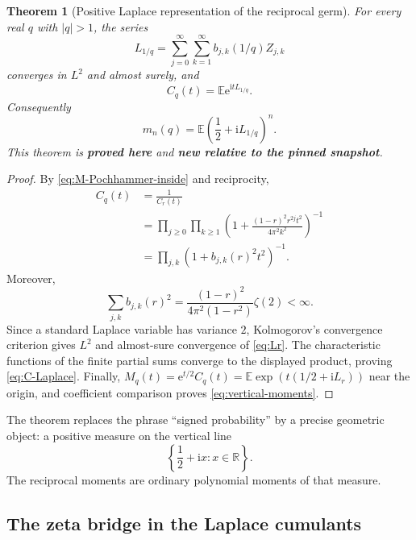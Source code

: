 \documentclass[11pt,oneside]{article}
\numberwithin{equation}{section}
\newtheorem{theorem}{Theorem}[section]
\theoremstyle{definition}
\theoremstyle{remark}
\newcommand{\R}{\mathbb R}
\newcommand{\E}{\mathbb E}
\newcommand{\e}{\mathrm e}
\newcommand{\ii}{\mathrm i}
\newcommand{\proved}{\textcolor{deepgreen}{\textbf{proved here}}}
\newcommand{\auditnew}{\textcolor{deepviolet}{\textbf{new relative to the pinned snapshot}}}
\begin{document}
\begin{theorem}[Positive Laplace representation of the reciprocal germ]
\label{thm:laplace-dual}
For every real $q$ with $|q|>1$, the series
\begin{equation}
 L_{1/q}=\sum_{j=0}^{\infty}\sum_{k=1}^{\infty}
 b_{j,k}(1/q)Z_{j,k}
 \label{eq:Lr}
\end{equation}
converges in $L^2$ and almost surely, and
\begin{equation}
 \boxed{C_q(t)=\E\e^{\ii tL_{1/q}}.}
 \label{eq:C-Laplace}
\end{equation}
Consequently
\begin{equation}
 \boxed{m_n(q)=\E\left(\frac12+\ii L_{1/q}\right)^n.}
 \label{eq:vertical-moments}
\end{equation}
This theorem is \proved{} and \auditnew.
\end{theorem}

\begin{proof}
By \eqref{eq:M-Pochhammer-inside} and reciprocity,
\begin{align*}
 C_q(t)
 &=\frac1{C_r(t)}\\
 &=\prod_{j\ge0}\prod_{k\ge1}
 \left(1+\frac{(1-r)^2r^{2j}t^2}{4\pi^2k^2}\right)^{-1}\\
 &=\prod_{j,k}\left(1+b_{j,k}(r)^2t^2\right)^{-1}.
\end{align*}
Moreover,
\[
 \sum_{j,k}b_{j,k}(r)^2
 =\frac{(1-r)^2}{4\pi^2(1-r^2)}\zeta(2)<\infty.
\]
Since a standard Laplace variable has variance $2$, Kolmogorov's convergence
criterion gives $L^2$ and almost-sure convergence of \eqref{eq:Lr}.  The
characteristic functions of the finite partial sums converge to the displayed
product, proving \eqref{eq:C-Laplace}.  Finally,
$M_q(t)=\e^{t/2}C_q(t)=\E\exp(t(1/2+\ii L_r))$ near the origin, and coefficient
comparison proves \eqref{eq:vertical-moments}.
\end{proof}

The theorem replaces the phrase ``signed probability'' by a precise geometric
object: a positive measure on the vertical line
\begin{equation}
 \left\{\frac12+\ii x:x\in\R\right\}.
 \label{eq:vertical-line}
\end{equation}
The reciprocal moments are ordinary polynomial moments of that measure.

\subsection{The zeta bridge in the Laplace cumulants}
\end{document}

